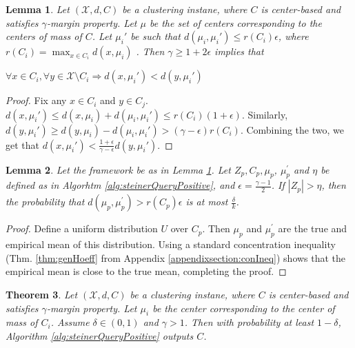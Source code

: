\documentclass{article}
\newcommand{\mc}{\mathcal}
\newtheorem{theorem}{Theorem}
\newtheorem{lemma}[theorem]{Lemma}
\begin{document}
\begin{lemma}
\label{lemma:hasGammaMargin}
Let $(\mc X, d, C)$ be a clustering instane, where $C$ is center-based and satisfies $\gamma$-margin property. Let $\mu$ be the set of centers corresponding to the centers of mass of $C$. Let $\mu_i'$ be such that $d(\mu_i, \mu_i') \le r(C_i)\epsilon$, where $r(C_i) = \max_{x\in C_i}d(x, \mu_i)$ . Then $\gamma \ge 1 + 2\epsilon$ implies that 
\begin{center}$\forall x \in C_i, \forall y \in {\mc X} \setminus C_i \Rightarrow d(x, \mu_i') < d(y, \mu_i')$\end{center}
\end{lemma}

\begin{proof}
Fix any $x \in C_i$ and $y \in C_j$. $d(x, \mu_i') \le d(x, \mu_i)+d(\mu_i, \mu_i') \le r(C_i) (1+\epsilon)$. Similarly, $d(y, \mu_i') \ge d(y, \mu_i) - d(\mu_i, \mu_i') > (\gamma -\epsilon)r(C_i)$. Combining the two, we get that $d(x, \mu_i') < \frac{1+\epsilon}{\gamma-\epsilon}d(y, \mu_i')$. 
\end{proof}

\begin{lemma}
\label{lemma:phase1}
Let the framework be as in Lemma \ref{lemma:hasGammaMargin}. Let $Z_p, C_p, \mu_p$, $\mu_p^\prime$ and $\eta$ be defined as in Algorhtm \ref{alg:steinerQueryPositive}, and $\epsilon = \frac{\gamma - 1}{2}$. If $|Z_p| > \eta$, then the probability that $d(\mu_p, \mu_p^\prime) > r(C_p)\epsilon$ is at most $\frac{\delta}{k}$.
\end{lemma}
\begin{proof}
Define a uniform distribution $U$ over $C_p$. Then $\mu_p$ and $\mu_p^\prime$ are the true and empirical mean of this distribution. Using a standard concentration inequality (Thm. \ref{thm:genHoeff} from Appendix \ref{appendixsection:conIneq}) shows that the empirical mean is close to the true mean, completing the proof.

\end{proof}

\begin{theorem}
\label{thm:steinerQueryPositive}
Let $(\mc X, d, C)$ be a clustering instane, where $C$ is center-based and satisfies $\gamma$-margin property. Let $\mu_i$ be the center corresponding to the center of mass of $C_i$.
Assume $\delta \in (0, 1)$ and $\gamma > 1$. Then with probability at least $1-\delta$, Algorithm \ref{alg:steinerQueryPositive} outputs $C$.
\end{theorem}
\end{document}

